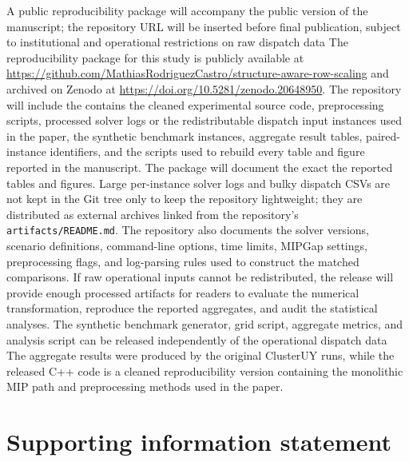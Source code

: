 \documentclass[AMA,Times1COL]{WileyNJDv5} %
\providecommand{\DIFadd}[1]{{\protect\color{blue} \sf #1}} %
\providecommand{\DIFdel}[1]{{\protect\color{red} \scriptsize #1}} %
\providecommand{\DIFaddbegin}{} %
\providecommand{\DIFaddend}{} %
\providecommand{\DIFdelbegin}{} %
\providecommand{\DIFdelend}{} %
\begin{document}
\DIFdelbegin \DIFdel{A public reproducibility package will accompany the public version of the manuscript; the repository URL will be inserted before final publication, subject to institutional and operational restrictions on raw dispatch data}\DIFdelend \DIFaddbegin \DIFadd{The reproducibility package for this study is publicly available at
}\url{https://github.com/MathiasRodriguezCastro/structure-aware-row-scaling} \DIFadd{and archived
on Zenodo at }\url{https://doi.org/10.5281/zenodo.20648950}\DIFaddend . The
repository \DIFdelbegin \DIFdel{will include the }\DIFdelend \DIFaddbegin \DIFadd{contains the cleaned }\DIFaddend experimental source code, preprocessing scripts, \DIFdelbegin \DIFdel{processed solver logs or }\DIFdelend \DIFaddbegin \DIFadd{the redistributable
dispatch input instances used in the paper, the synthetic benchmark instances, }\DIFaddend aggregate
result tables, paired-instance identifiers, and the scripts used to rebuild \DIFdelbegin \DIFdel{every table and figure reported
in the manuscript. The package will document the exact }\DIFdelend \DIFaddbegin \DIFadd{the reported
tables and figures. Large per-instance solver logs and bulky dispatch CSVs are not kept in the
Git tree only to keep the repository lightweight; they are distributed as external
archives linked from the repository's \texttt{artifacts/README.md}. The repository also
documents the }\DIFaddend solver versions, scenario definitions, command-line options, time limits,
MIPGap settings, preprocessing flags, and log-parsing rules used to construct the matched
comparisons. \DIFdelbegin \DIFdel{If raw operational inputs cannot be redistributed, the release will provide enough processed artifacts for readers to evaluate the numerical transformation, reproduce the reported aggregates, and audit the statistical analyses. The synthetic benchmark generator, grid script, aggregate metrics, and analysis script can be released independently of the operational dispatch data}\DIFdelend \DIFaddbegin \DIFadd{The aggregate results were produced by the original ClusterUY runs, while
the released C++ code is a cleaned reproducibility version containing the monolithic MIP
path and preprocessing methods used in the paper}\DIFaddend .

\DIFdelbegin \section*{\DIFdel{Supporting information statement}}
\DIFdelend \DIFaddbegin {}
\DIFaddend 
\end{document}

